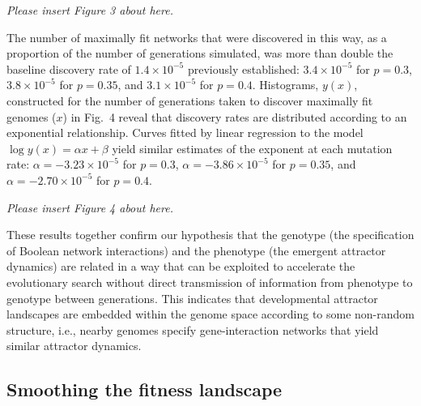 \documentclass[10pt,letterpaper]{article}
\begin{document}
\vspace{1em}\emph{\noindent Please insert Figure 3 about here.}\vspace{1em}

The number of maximally fit networks that were discovered in this way, as a proportion of the number of generations simulated, was more than double the baseline discovery rate of $1.4\times 10^{-5}$ previously established: $3.4\times 10^{-5}$ for $p=0.3$, $3.8\times 10^{-5}$ for $p=0.35$, and $3.1\times 10^{-5}$ for $p=0.4$. %
Histograms, $y(x)$, constructed for the number of generations taken to discover maximally fit genomes ($x$) in Fig.~4 reveal that discovery rates are distributed according to an exponential relationship. Curves fitted by linear regression to the model $\log y(x)=\alpha x+\beta$ yield similar estimates of the exponent at each mutation rate: $\alpha=-3.23\times 10^{-5}$ for $p=0.3$,  $\alpha=-3.86\times 10^{-5}$ for $p=0.35$, and $\alpha=-2.70\times 10^{-5}$ for $p=0.4$. %

\vspace{1em}\emph{\noindent Please insert Figure 4 about here.}\vspace{1em}

These results together confirm our hypothesis that the genotype (the specification of Boolean network interactions) and the phenotype (the emergent attractor dynamics) are related in a way that can be exploited to accelerate the evolutionary search  without direct transmission of information from phenotype to genotype between generations. This indicates that developmental attractor landscapes are embedded within the genome space according to some non-random structure, i.e., nearby genomes specify gene-interaction networks that yield similar attractor dynamics.

\subsection*{Smoothing the fitness landscape}
\end{document}
